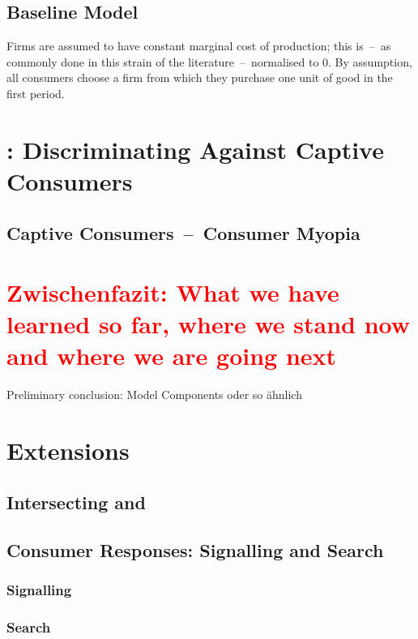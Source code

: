 \documentclass[a4paper, 11 pt, fleqn]{article}
\begin{document}
\subsection{Baseline Model}
Firms are assumed to have constant marginal cost of production; this is~--~as commonly done in this strain of the literature~--~normalised to 0. By assumption, all consumers
choose a firm from which they purchase one unit of good in the first period.
\section{\citet{Armstrong.2019}: Discriminating Against Captive Consumers}
%
\subsection{Captive Consumers~--~Consumer Myopia}
%
\section{\textcolor{red}{Zwischenfazit: What we have learned so far, where we stand now and where we are going next}}
Preliminary conclusion: Model Components oder so ähnlich
%
\section{Extensions} \label{sec:extensions}
%
\subsection{Intersecting \citet{Choe.2018} and \citet{Armstrong.2019}}
%
\subsection{Consumer Responses: Signalling and Search}
%
\subsubsection{Signalling}
%
\subsubsection{Search}
%
\newpage
{}


\newpage
\end{document}
